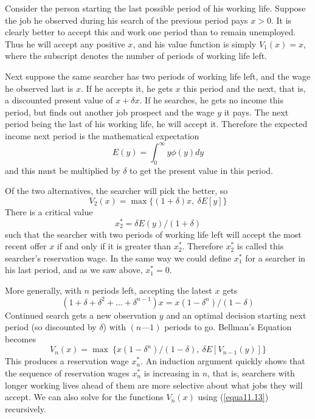 Consider the person starting the last possible period of his working life. Suppose the job he observed during his search of the previous period pays $x > 0$. It is clearly better to accept this and work one period than to remain unemployed. Thus he will accept any positive $x$, and his value function is simply $V_1(x) =x$, where the subscript denotes the number of periods of working life left.

Next suppose the same searcher has two periods of working life left, and the wage he observed last is $x$. If he accepts it, he gets $x$ this period and the next, that is, a discounted present value of $x + \delta x$. If he searches, he gets no income this period, but finds out another job prospect and the wage $y$ it pays. The next period being the last of his working life, he will accept it. Therefore the expected income next period is the mathematical expectation
\begin{equation*}
E(y) = \int_0^\infty y \phi(y) dy
\end{equation*}
and this must be multiplied by $\delta$ to get the present value in this period.

Of the two alternatives, the searcher will pick the better, so
\begin{equation} \label{equa11.11}
 V_2(x) = \max \{ (1 + \delta) x,  \  \delta E[y]  \}
\end{equation}
There is a critical value
\begin{equation} \label{equa11.12}
 x_2^* = \delta E(y)/(1+\delta)
\end{equation}
such that the searcher with two periods of working life left will accept the most recent offer $x$ if and only if it is greater than $x_2^*$. Therefore $x_2^*$ is called this searcher's reservation wage. In the same way we could define $x_1^*$ for a searcher in his last period, and as we saw above, $x_1^* = 0$.

More generally, with $n$ periods left, accepting the latest $x$ gets
\begin{equation*}
 (1+\delta+\delta^2 + \dots + \delta^{n-1} )x = x (1-\delta^n)/(1-\delta)
\end{equation*}
Continued search gets a new observation $y$ and an optimal decision starting next period (so discounted by $\delta$) with $(n — 1)$ periods to go. Bellman's Equation becomes
\begin{equation} \label{11.13}
V_n(x) = \max \ \{ x(1-\delta^n)/(1-\delta), \ \delta E[V_{n-1}(y) ]  \}
\end{equation}
This produces a reservation wage $x_n^*$. An induction argument quickly shows that the sequence of reservation wages $x_n^*$ is increasing in $n$, that is, searchers with longer working lives ahead of them are more selective about what jobs they will accept. We can also solve for the functions $V_n(x)$ using (\ref{equa11.13}) recursively.

